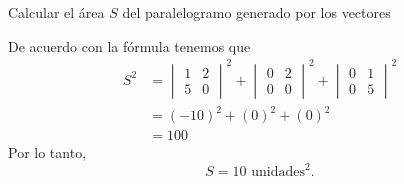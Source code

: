 \begin{examplebox}{}{}
    Calcular el área $S$ del paralelogramo generado por los vectores
    \begin{matrizn}
    \end{matrizn}

    \tcblower
    \solucion De acuerdo con la fórmula tenemos que
    \begin{align*}
        S^2 & = \begin{vmatrix}
        1 & 2 \\
        5 & 0
        \end{vmatrix}^2 + \begin{vmatrix}
        0 & 2 \\
        0 & 0
        \end{vmatrix}^2 + \begin{vmatrix}
        0 & 1 \\
        0 & 5
        \end{vmatrix}^2 \\
        & = (-10)^2 + (0)^2 + (0)^2 \\
        & = 100
    \end{align*}
    Por lo tanto,
    $$S = 10 \text{ unidades}^2.$$
\end{examplebox}

